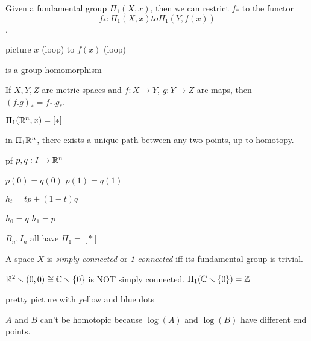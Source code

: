 \documentclass[11pt,leqno,oneside]{amsart}
\numberwithin{thm}{section}
\newcommand{\minus}{\smallsetminus}
\newcommand{\de}{\emph}
\begin{document}
\begin{prop}
  Given a fundamental group $\Pi_1(X, x)$, then we can restrict $f_*$ to the functor $$f_* : \Pi_1(X, x) to \Pi_1(Y, f(x))$$.

  picture
  $x$ (loop) to $f(x)$ (loop)

  is a group homomorphism
\end{prop}
\begin{prop}
  If $X,Y,Z$ are metric spaces and $f: X \to Y$, $g: Y \to Z$ are maps, then $(f.g)_* = f_*.g_*$.
\end{prop}

\begin{example}
  $\Pi_1({\mathbb R}^n, x) = [*]$

  in $\Pi_1 {\mathbb R}^n$, there exists a unique path between any two points, up to homotopy.

  pf
  $p,q: I \to {\mathbb R}^n$

  $p(0) = q(0)$
  $p(1) = q(1)$

  $h_t = tp + (1-t)q$

  $h_0 = q$
  $h_1 = p$

  $B_n, I_n$ all have $\Pi_1 = [*]$
\end{example}

\begin{thm}[Hatcher 1.6]
  A space $X$ is \de{simply connected} or \de{1-connected} iff its fundamental group is trivial.
\end{thm}
\begin{example}
  $\R^2 \minus (0,0) \isom \C \minus \{0\}$ is NOT simply connected.
  $\Pi_1(\C \minus \{0\}) = \Z$
\end{example}
\begin{example}
  pretty picture with yellow and blue dots

  $A$ and $B$ can't be homotopic because $\log(A)$ and $\log(B)$ have different end points.
\end{example}
\end{document}
